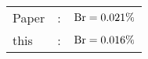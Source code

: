       \begin{tabular}{lcr}
          Paper &:& $\mathrm{Br}  = 0.021\%$ \\
          this      &:& $\mathrm{Br}  = 0.016\%$ \\        
      \end{tabular}
